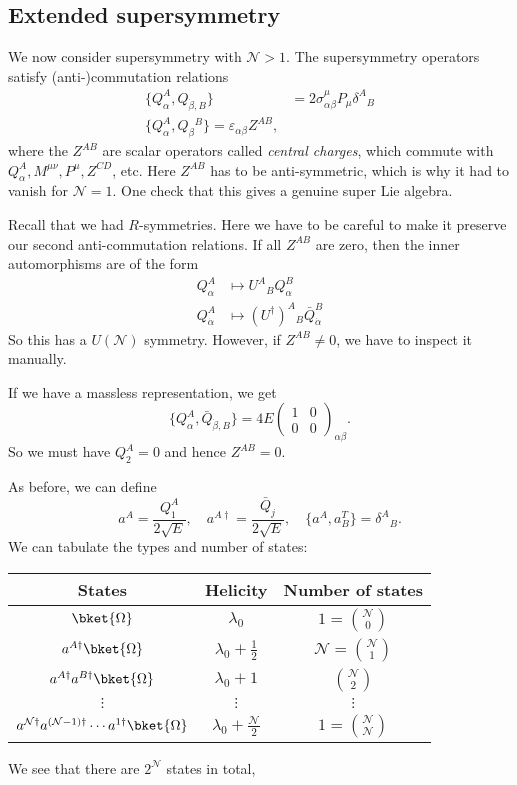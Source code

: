 \documentclass[a4paper]{article}
\begin{document}
\subsection{Extended supersymmetry}
We now consider supersymmetry with $\mathcal{N} > 1$. The supersymmetry operators satisfy (anti-)commutation relations
\begin{align*}
  \{Q_\alpha^A, Q_{\dot{\beta}, B}\} &= 2 \sigma^\mu_{\alpha\beta} P_\mu \delta^A\!_B\\
  \{Q_\alpha^A, Q_\beta\!^B\} = \varepsilon_{\alpha\beta} Z^{AB},
\end{align*}
where the $Z^{AB}$ are scalar operators called \emph{central charges}, which commute with $Q^A_\alpha, M^{\mu\nu}, P^\mu, Z^{CD}$, etc. Here $Z^{AB}$ has to be anti-symmetric, which is why it had to vanish for $\mathcal{N} = 1$. One check that this gives a genuine super Lie algebra.

Recall that we had $R$-symmetries. Here we have to be careful to make it preserve our second anti-commutation relations. If all $Z^{AB}$ are zero, then the inner automorphisms are of the form
\begin{align*}
  Q_\alpha^A &\mapsto U^A\!_B Q_\alpha^B\\
  Q_{\dot{\alpha}}^A &\mapsto  (U^\dagger)^A\!_B  \bar{Q}_{\dot{\alpha}}^B
\end{align*}
So this has a $U(\mathcal{N})$ symmetry. However, if $Z^{AB} \not= 0$, we have to inspect it manually.

If we have a massless representation, we get
\[
  \{Q_\alpha^A, \bar{Q}_{\dot{\beta}, B}\} = 4E 
  \begin{pmatrix}
    1 & 0\\
    0 & 0
  \end{pmatrix}_{\alpha\beta}.
\]
So we must have $Q_2^A = 0$ and hence $Z^{AB} = 0$.

As before, we can define
\[
  a^A = \frac{Q_1^A}{2\sqrt{E}},\quad a^{A\dagger} = \frac{\bar{Q}_j}{2 \sqrt{E}},\quad\{a^A, a_B^T\} = \delta^A\!_B.
\]
We can tabulate the types and number of states:
\begin{tabular}{ccc}
  \toprule
  States & Helicity & Number of states\\
  \midrule
  $\bket{\Omega}$ & $\lambda_0$ & $1 = \binom{\mathcal{N}}{0}$\\
  $a^{A\dagger} \bket{\Omega}$ & $\lambda_0 + \frac{1}{2}$ & $\mathcal{N} = \binom{\mathcal{N}}{1}$\\
  $a^{A\dagger} a^{B\dagger} \bket{\Omega}$ & $\lambda_0 + 1$ & $\binom{\mathcal{N}}{2}$\\
  $\vdots$ & $\vdots$ & $\vdots$ \\
  $a^{\mathcal{N}\dagger} a^{(\mathcal{N} - 1)\dagger} \cdots a^{1\dagger} \bket{\Omega}$ & $\lambda_0 + \frac{\mathcal{N}}{2}$ & $1 = \binom{\mathcal{N}}{\mathcal{N}}$\\
  \bottomrule
\end{tabular}
We see that there are $2^{\mathcal{N}}$ states in total, 
\end{document}
